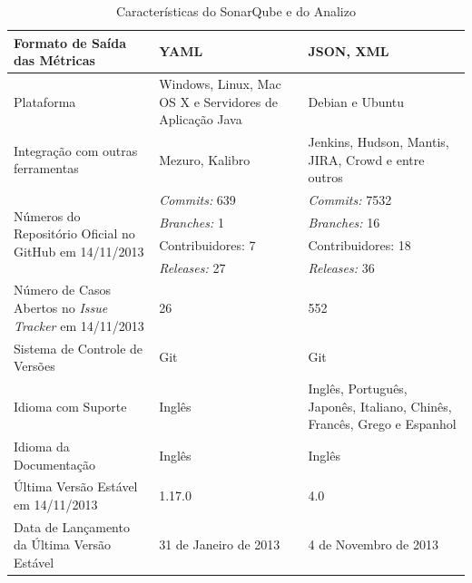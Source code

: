 \begin{savenotes}
\begin{table}[!ht]
\begin{tabular}{|p{5cm}|p{4.5cm}|p{5cm}|}
Formato de Saída das Métricas  & YAML & JSON, XML \\ \hline

Plataforma  &Windows, Linux, Mac OS X e Servidores de Aplicação Java & Debian e Ubuntu                                                                                              \\ \hline

Integração com outras ferramentas & Mezuro, Kalibro & Jenkins, Hudson, Mantis, JIRA, Crowd e entre outros \\ \hline

\multirow{4}{5cm}{Números do Repositório Oficial no GitHub em 14/11/2013}
& \textit{Commits:} 639  & \textit{Commits:} 7532\\ \cline{2-3} 

&\textit{Branches:} 1 & \textit{Branches:} 16  \\ \cline{2-3} 
& Contribuidores: 7 & Contribuidores: 18 \\ \cline{2-3} 
& \textit{Releases:} 27  & \textit{Releases:} 36

 \\ \hline

Número de Casos Abertos no \textit{Issue Tracker} em 14/11/2013 & 26  & 552  
\\ \hline

Sistema de Controle de Versões & Git & Git \\ \hline

Idioma com Suporte & Inglês & Inglês, Português, Japonês, Italiano, Chinês, Francês, Grego e Espanhol \\ \hline

Idioma da Documentação & Inglês & Inglês

\\ \hline
Última Versão Estável em 14/11/2013 & 1.17.0 & 4.0  

\\ \hline
Data de Lançamento da Última Versão Estável & 31 de Janeiro de 2013 & 4 de Novembro de 2013

\\ \hline
\end{tabular}
\caption{Características do SonarQube e do Analizo}
\label{dados-ferramentas-estatica}
\end{table}
\FloatBarrier
\end{savenotes}

